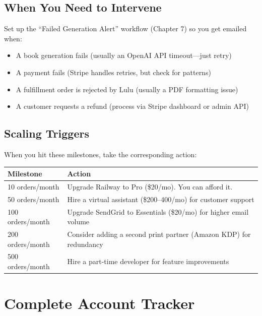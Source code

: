 \documentclass[12pt, letterpaper, oneside]{book}
\begin{document}
\section{When You Need to Intervene}

Set up the ``Failed Generation Alert'' workflow (Chapter 7) so you get emailed when:
\begin{itemize}[leftmargin=2em]
  \item A book generation fails (usually an OpenAI API timeout---just retry)
  \item A payment fails (Stripe handles retries, but check for patterns)
  \item A fulfillment order is rejected by Lulu (usually a PDF formatting issue)
  \item A customer requests a refund (process via Stripe dashboard or admin API)
\end{itemize}

\section{Scaling Triggers}

When you hit these milestones, take the corresponding action:

\begin{table}[H]
\centering
\begin{tabularx}{\textwidth}{lX}
\toprule
\textbf{Milestone} & \textbf{Action} \\
\midrule
10 orders/month & Upgrade Railway to Pro (\$20/mo). You can afford it. \\
50 orders/month & Hire a virtual assistant (\$200--400/mo) for customer support \\
100 orders/month & Upgrade SendGrid to Essentials (\$20/mo) for higher email volume \\
200 orders/month & Consider adding a second print partner (Amazon KDP) for redundancy \\
500 orders/month & Hire a part-time developer for feature improvements \\
\bottomrule
\end{tabularx}
\end{table}


\appendix
\chapter{Complete Account Tracker}
\end{document}
